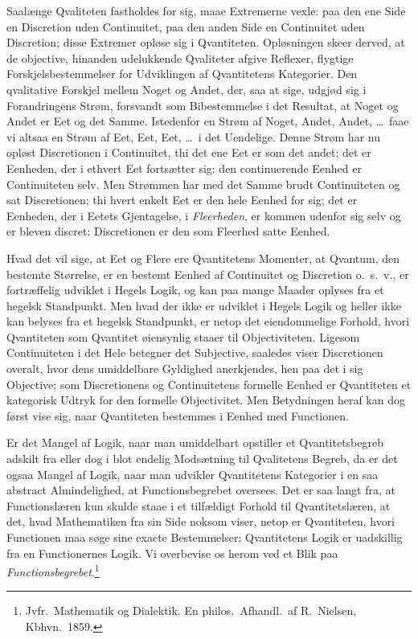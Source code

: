 \documentclass[12pt]{book}
\newcommand{\opage}[1]{\marginnote{\footnotesize\textit{[#1]}}}
\begin{document}
Saalænge Qvaliteten fastholdes for sig, maae Extremerne vexle: paa den ene Side en Discretion uden
Continuitet, paa den anden Side en Continuitet uden Discretion; disse Extremer opløse sig i
Qvantiteten. Opløsningen skeer derved, at de objective, hinanden udelukkende Qvaliteter afgive Reflexer,
flygtige Forskjelsbestemmelser for Udviklingen af Qvantitetens Kategorier. Den qvalitative Forskjel
mellem Noget og Andet, der, saa at sige, udgjød sig i Forandringens Strøm, forsvandt som Bibestemmelse i
det Resultat, at Noget og Andet er Eet og det Samme. Istedenfor en Strøm af Noget, Andet, Andet, \ldots\
faae vi altsaa en Strøm af Eet, Eet, Eet, \ldots\ i det Uendelige. Denne Strøm har nu opløst
Discretionen i Continuitet, thi det ene Eet er som det andet; det er Eenheden, der i ethvert Eet
fortsætter sig: den continuerende Eenhed er Continuiteten selv. Men Strømmen har med det Samme brudt
Continuiteten og sat Discretionen; thi hvert enkelt Eet er den hele Eenhed for sig; det er Eenheden, der
i Eetets Gjentagelse, i \emph{Fleerheden}, er kommen udenfor sig selv og er bleven discret: Discretionen
er den som Fleerhed satte Eenhed.

Hvad det vil sige, at Eet og Flere ere Qvantitetens Momenter, at Qvantum, den bestemte Størrelse, er en
bestemt Eenhed af Continuitet og Discretion o.\ s.\ v., er fortræffelig udviklet i Hegels Logik, og kan
paa mange Maader oplyses fra et hegelsk Standpunkt. Men hvad der ikke er udviklet i
\opage{297} Hegels Logik og heller ikke kan belyses fra et hegelsk Standpunkt, er netop det eiendommelige Forhold,
hvori Qvantiteten som Qvantitet øiensynlig staaer til Objectiviteten. Ligesom Continuiteten i det Hele
betegner det Subjective, saaledes viser Discretionen overalt, hvor dens umiddelbare Gyldighed
anerkjendes, hen paa det i sig Objective; som Discretionens og Continuitetens formelle Eenhed er
Qvantiteten et kategorisk Udtryk for den formelle Objectivitet. Men Betydningen heraf kan dog først vise
sig, naar Qvantiteten bestemmes i Eenhed med Functionen.

Er det Mangel af Logik, naar man umiddelbart opstiller et Qvantitetsbegreb adskilt fra eller dog i blot
endelig Modsætning til Qvalitetens Begreb, da er det ogsaa Mangel af Logik, naar man udvikler
Qvantitetens Kategorier i en saa abstract Almindelighed, at Functionsbegrebet oversees. Det er saa langt
fra, at Functionslæren kun skulde staae i et tilfældigt Forhold til Qvantitetslæren, at det, hvad
Mathematiken fra sin Side noksom viser, netop er Qvantiteten, hvori Functionen maa søge sine exacte
Bestemmelser: Qvantitetens Logik er uadskillig fra en Functionernes Logik. Vi overbevise os herom ved et
Blik paa \emph{Functionsbegrebet}.\footnote{Jvfr.\ Mathematik og Dialektik. En philos.\ Afhandl.\ af
R.\ Nielsen, Kbhvn.\ 1859.}
\end{document}
